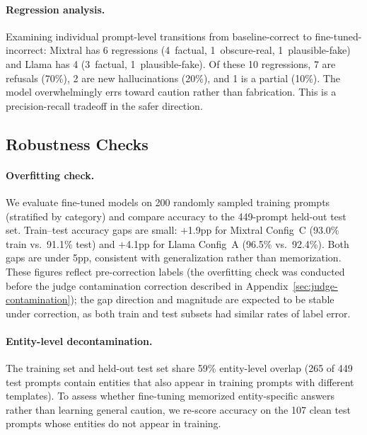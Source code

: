 \paragraph{Regression analysis.} Examining individual prompt-level transitions from baseline-correct to fine-tuned-incorrect: Mixtral has 6 regressions (4~factual, 1~obscure-real, 1~plausible-fake) and Llama has 4 (3~factual, 1~plausible-fake). Of these 10 regressions, 7 are refusals (70\%), 2 are new hallucinations (20\%), and 1 is a partial (10\%). The model overwhelmingly errs toward caution rather than fabrication. This is a precision-recall tradeoff in the safer direction.

\subsection{Robustness Checks}
\label{sec:ft-robustness}

\paragraph{Overfitting check.} We evaluate fine-tuned models on 200 randomly sampled training prompts (stratified by category) and compare accuracy to the 449-prompt held-out test set. Train--test accuracy gaps are small: $+$1.9pp for Mixtral Config~C (93.0\% train vs.\ 91.1\% test) and $+$4.1pp for Llama Config~A (96.5\% vs.\ 92.4\%). Both gaps are under 5pp, consistent with generalization rather than memorization. These figures reflect pre-correction labels (the overfitting check was conducted before the judge contamination correction described in Appendix~\ref{sec:judge-contamination}); the gap direction and magnitude are expected to be stable under correction, as both train and test subsets had similar rates of label error.

\paragraph{Entity-level decontamination.} The training set and held-out test set share 59\% entity-level overlap (265 of 449 test prompts contain entities that also appear in training prompts with different templates). To assess whether fine-tuning memorized entity-specific answers rather than learning general caution, we re-score accuracy on the 107 clean test prompts whose entities do not appear in training.


